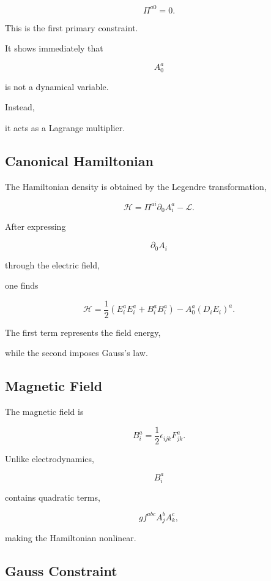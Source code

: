 \[
\boxed{
\Pi^{a0}=0.
}
\]

This is the first primary constraint.

It shows immediately that

\[
A_0^a
\]

is not a dynamical variable.

Instead,

it acts as a Lagrange multiplier.


\subsection{Canonical Hamiltonian}

The Hamiltonian density is obtained by the Legendre transformation,

\[
\boxed{
\mathcal H
=
\Pi^{ai}\partial_0A_i^a
-
\mathcal L.
}
\]

After expressing

\[
\partial_0A_i
\]

through the electric field,

one finds

\[
\boxed{
\mathcal H
=
\frac12
(E_i^aE_i^a+B_i^aB_i^a)
-
A_0^a
(D_iE_i)^a.
}
\]

The first term represents the field energy,

while the second imposes Gauss's law.


\subsection{Magnetic Field}

The magnetic field is

\[
\boxed{
B_i^a
=
\frac12
\epsilon_{ijk}
F_{jk}^a.
}
\]

Unlike electrodynamics,

\[
B_i^a
\]

contains quadratic terms,

\[
gf^{abc}
A_j^bA_k^c,
\]

making the Hamiltonian nonlinear.


\subsection{Gauss Constraint}

